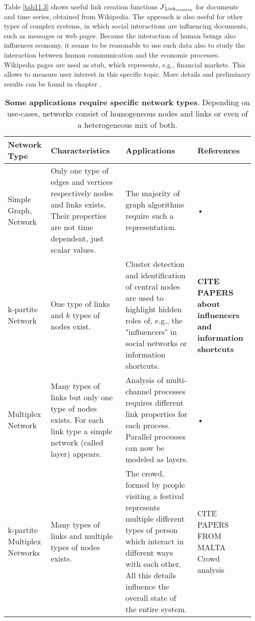 \documentclass[a4paper,10pt]{scrbook}
\begin{document}
Table \ref{tab11.3} shows useful link creation functions $\mathcal{F}_{\rm {Link}_{\rm {creation}}}$ for documents and time series, obtained from Wikipedia. The approach is also useful for other types of complex systems, in which social interactions are influencing documents, such as messages or web pages. Because the interaction of human beings also influences economy, it seams to be reasonable to use such data also to study the interaction between human communication and the economic processes. Wikipedia pages are used as stub, which represents, e.g., financial markets. This allows to measure user interest in this specific topic. More details and preliminary results can be found in chapter \label{CASEIII}. 

\begin{table}
\begin{tabular}{|C{3cm}|L{5cm}|L{5cm}|L{2cm}|}
\hline 
Network Type& Characteristics & Applications & References \\ 
\hline 
Simple Graph, Network & Only one type of edges and vertices respectively nodes and links exists. Their properties are not time dependent, just scalar values. & The majority of graph algorithms require such a representation. & • \\ 
\hline 
k-partite Network & One type of links and $k$ types of nodes exist. &Cluster detection and identification of central nodes are used to highlight hidden roles of, e.g., the "influencers" in social networks or information shortcuts. & \textbf{CITE PAPERS about influencers and information shortcuts} \\ 
\hline 
Multiplex Network & Many types of links but only one type of nodes exists. For each link type a simple network (called layer) appears. & Analysis of multi-channel processes requires different link properties for each process. Parallel processes can now be modeled as layers.& • \\ 
\hline 
k-partite Multiplex Networks & Many types of links and multiple types of nodes exists. & The crowd, formed by people visiting a festival represents multiple different types of person which interact in different ways with each other. All this details influence the overall state of the entire system. & CITE PAPERS FROM MALTA Crowd analysis \\ 
\hline 
\end{tabular} 
\caption{\textbf{Some applications require specific network types}. Depending on use-cases, networks consist of homogeneous nodes and links or even of a heterogeneous mix of both.} 
\label{tab11.1} 
\end{table}
\end{document}
